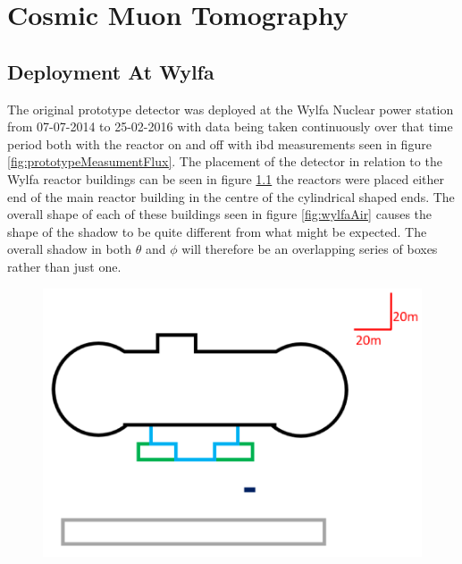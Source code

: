 
\chapter{Cosmic Muon Tomography}

\ifpdf
    \graphicspath{{Chapter5/Figs/Raster/}{Chapter5/Figs/PDF/}{Chapter5/Figs/}}
\else
    \graphicspath{{Chapter5/Figs/Vector/}{Chapter5/Figs/}}
\fi

\section{Deployment At Wylfa}\label{sec:deploymentAtWylfa}
The original prototype detector was deployed at the Wylfa Nuclear power station from 07-07-2014 to 25-02-2016 with data being taken continuously over that time period both with the reactor on and off with ibd measurements seen in figure \ref{fig:prototypeMeasumentFlux}. The placement of the detector in relation to the Wylfa reactor buildings can be seen in figure \ref{fig:wylfaTrace} the reactors were placed either end of the main reactor building in the centre of the cylindrical shaped ends. The overall shape of each of these buildings seen in figure \ref{fig:wylfaAir} causes the shape of the shadow to be quite different from what might be expected. The overall shadow in both $\theta$ and $\phi$ will therefore be an overlapping series of boxes rather than just one.   
 
\begin{figure}[H]
 \centering
 \includegraphics[width=0.7\linewidth]{Chapter5/Figs/Raster/wylfaTrace.png}
 \label{fig:wylfaTrace}
\end{figure}

